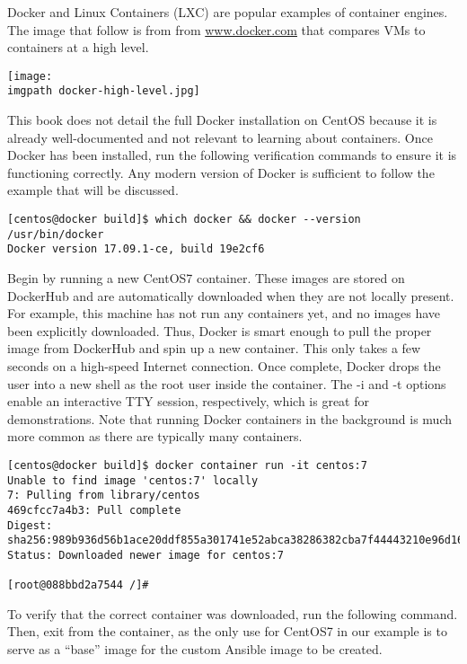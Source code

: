 Docker and Linux Containers (LXC) are popular examples of container engines.
The image that follow is from from \url{www.docker.com} that compares VMs to
containers at a high
level.

    \begin{minipage}[t]{\linewidth}
	  \centering
      \texttt{[image: \\imgpath docker-high-level.jpg]}
    \end{minipage}

This book does not detail the full Docker installation on CentOS because it is
already well-documented and not relevant to learning about containers. Once
Docker has been installed, run the following verification commands to ensure
it is functioning correctly. Any modern version of Docker is sufficient to
follow the example that will be discussed.

\begin{verbatim}
[centos@docker build]$ which docker && docker --version
/usr/bin/docker
Docker version 17.09.1-ce, build 19e2cf6
\end{verbatim}


Begin by running a new CentOS7 container. These images are stored on DockerHub
and are automatically downloaded when they are not locally present. For
example, this machine has not run any containers yet, and no images have been
explicitly downloaded. Thus, Docker is smart enough to pull the proper image
from DockerHub and spin up a new container. This only takes a few seconds on a
high-speed Internet connection. Once complete, Docker drops the user into a
new shell as the root user inside the container. The -i and -t options enable
an interactive TTY session, respectively, which is great for demonstrations.
Note that running Docker containers in the background is much more common as
there are typically many containers.

\begin{verbatim}
[centos@docker build]$ docker container run -it centos:7
Unable to find image 'centos:7' locally
7: Pulling from library/centos
469cfcc7a4b3: Pull complete 
Digest: sha256:989b936d56b1ace20ddf855a301741e52abca38286382cba7f44443210e96d16
Status: Downloaded newer image for centos:7

[root@088bbd2a7544 /]# 
\end{verbatim}

To verify that the correct container was downloaded, run the following
command. Then, exit from the container, as the only use for CentOS7 in our
example is to serve as a ``base'' image for the custom Ansible image to be
created.

